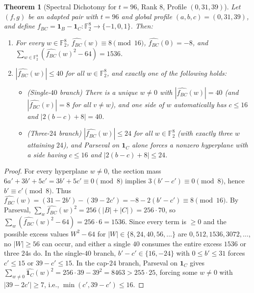 \documentclass[11pt]{article}
\newtheorem{theorem}{Theorem}[section]
\theoremstyle{definition}
\newcommand{\F}{\mathbb{F}}
\newcommand{\ind}{\mathbf{1}}
\begin{document}
\begin{theorem}[Spectral Dichotomy for $t = 96$, Rank $8$, Profile $(0, 31, 39)$]
\label{thm:t96-03139}
Let $(f, g)$ be an adapted pair with $t = 96$ and global profile $(a, b, c) = (0, 31, 39)$, and define $f_{BC} = \ind_B - \ind_C : \F_2^8 \to \{-1, 0, 1\}$. Then:
\begin{enumerate}[nosep]
  \item For every $w \in \F_2^8$, $\widehat{f_{BC}}(w) \equiv 8 \pmod{16}$, $\widehat{f_{BC}}(0) = -8$, and $\sum_{w \in \F_2^8} (\widehat{f_{BC}}(w)^2 - 64) = 1536$.
  \item $|\widehat{f_{BC}}(w)| \le 40$ for all $w \in \F_2^8$, and exactly one of the following holds:
  \begin{itemize}[nosep]
    \item \emph{(Single-$40$ branch)} There is a unique $w \neq 0$ with $|\widehat{f_{BC}}(w)| = 40$ (and $|\widehat{f_{BC}}(v)| = 8$ for all $v \neq w$), and one side of $w$ automatically has $c \le 16$ and $|2(b-c)+8| = 40$.
    \item \emph{(Three-$24$ branch)} $|\widehat{f_{BC}}(w)| \le 24$ for all $w \in \F_2^8$ (with exactly three $w$ attaining $24$), and Parseval on $\ind_C$ alone forces a nonzero hyperplane with a side having $c \le 16$ and $|2(b-c)+8| \le 24$.
  \end{itemize}
\end{enumerate}
\end{theorem}
\begin{proof}
For every hyperplane $w \neq 0$, the section mass $6a' + 3b' + 5c' = 3b' + 5c' \equiv 0 \pmod 8$ implies $3(b' - c') \equiv 0 \pmod 8$, hence $b' \equiv c' \pmod 8$.
Thus $\widehat{f_{BC}}(w) = (31 - 2b') - (39 - 2c') = -8 - 2(b' - c') \equiv 8 \pmod{16}$.
By Parseval, $\sum_w \widehat{f_{BC}}(w)^2 = 256(|B| + |C|) = 256 \cdot 70$, so $\sum_w (\widehat{f_{BC}}(w)^2 - 64) = 256 \cdot 6 = 1536$.
Since every term is $\ge 0$ and the possible excess values $W^2 - 64$ for $|W| \in \{8, 24, 40, 56, \dots\}$ are $0, 512, 1536, 3072, \dots$, no $|W| \ge 56$ can occur, and either a single $40$ consumes the entire excess $1536$ or three $24$s do.
In the single-$40$ branch, $b' - c' \in \{16, -24\}$ with $0 \le b' \le 31$ forces $c' \le 15$ or $39 - c' \le 15$.
In the cap-$24$ branch, Parseval on $\ind_C$ gives $\sum_{w \neq 0} \widehat{\ind_C}(w)^2 = 256 \cdot 39 - 39^2 = 8463 > 255 \cdot 25$, forcing some $w \neq 0$ with $|39 - 2c'| \ge 7$, i.e., $\min(c', 39 - c') \le 16$.
\end{proof}
\end{document}
